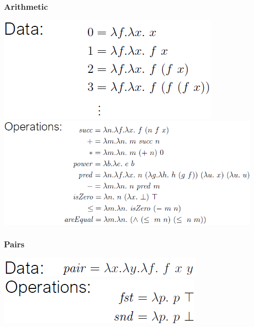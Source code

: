 \subsubsection{Arithmetic}
\includegraphics[width=0.35\linewidth]{img/lc_data2.png}
\includegraphics[width=0.65\linewidth]{img/lc_operations2.png}
\subsubsection{Pairs}
\includegraphics[width=0.5\linewidth]{img/lc_data3.png}
\includegraphics[width=0.5\linewidth]{img/lc_operations3.png}